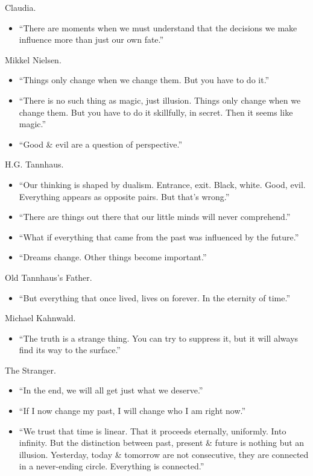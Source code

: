 \documentclass{article}
\begin{document}
\begin{enumerate}
	{\sc Claudia.}
	\begin{itemize}
		\item ``There are moments when we must understand that the decisions we make influence more than just our own fate.''
	\end{itemize}
	{\sc Mikkel Nielsen.}
	\begin{itemize}
		\item ``Things only change when we change them. But you have to do it.''
		\item ``There is no such thing as magic, just illusion. Things only change when we change them. But you have to do it skillfully, in secret. Then it seems like magic.''
		\item ``Good \& evil are a question of perspective.''
	\end{itemize}
	{\sc H.G. Tannhaus.}
	\begin{itemize}
		\item``Our thinking is shaped by dualism. Entrance, exit. Black, white. Good, evil. Everything appears as opposite pairs. But that's wrong.''
		\item ``There are things out there that our little minds will never comprehend.''
		\item ``What if everything that came from the past was influenced by the future.''
		\item ``Dreams change. Other things become important.''
	\end{itemize}
	{\sc Old Tannhaus's Father.}
	\begin{itemize}
		\item ``But everything that once lived, lives on forever. In the eternity of time.''
	\end{itemize}
	{\sc Michael Kahnwald.}
	\begin{itemize}
		\item ``The truth is a strange thing. You can try to suppress it, but it will always find its way to the surface.''
	\end{itemize}
	{\sc The Stranger.}
	\begin{itemize}
		\item ``In the end, we will all get just what we deserve.''
		\item ``If I now change my past, I will change who I am right now.''
		\item ``We trust that time is linear. That it proceeds eternally, uniformly. Into infinity. But the distinction between past, present \& future is nothing but an illusion. Yesterday, today \& tomorrow are not consecutive, they are connected in a never-ending circle. Everything is connected.''

\end{itemize}
\end{enumerate}
\end{document}
